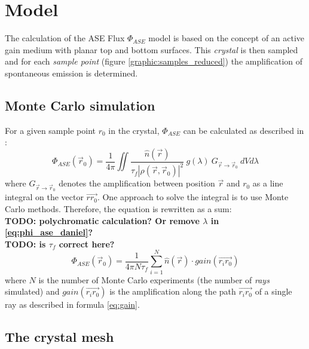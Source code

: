 \section{Model}

The calculation of the ASE Flux $\Phi_{ASE}$ model is based on the concept of an
active gain medium with planar top and bottom surfaces. This \emph{crystal} is
then sampled and for each \emph{sample point} (figure
\ref{graphic:samples_reduced}) the amplification of spontaneous emission is
determined. 



\subsection{Monte Carlo simulation}
\label{subsec:monteCarlo}

For a given sample point $r_0$ in the crystal, $\Phi_{ASE}$ can
be calculated as described in \cite{ASE2010}:
\begin{equation}
  \label{eq:phi_ase_daniel} 
  \Phi_{ASE}(\vec{r}_0)=\frac{1}{4\pi}\iint
  \frac
    {\hat{n}(\vec{r})}
    {\tau_{f}|\rho(\vec{r},\vec{r}_0)|^2}
  ~g(\lambda)
  ~G_{\vec{r}\rightarrow\vec{r}_0}
  ~dV d\lambda
\end{equation}
where $G_{\vec{r}\rightarrow\vec{r}_0}$ denotes the amplification between
position $\vec{r}$ and $r_0$ as a line integral on the vector
$\overrightarrow{rr_0}$.  One approach to solve the integral is to use Monte
Carlo methods. Therefore, the equation is rewritten as a sum:
\textbf{\\TODO: polychromatic calculation? Or remove $\lambda$ in
\eqref{eq:phi_ase_daniel}?\\}
\textbf{TODO: is $\tau_f$ correct here?} 
\begin{equation}
  \label{eq:monte_carlo_ase}
  \Phi_{ASE}(\vec{r}_0) = 
  \frac{1}{4\pi N\tau_f}
  \sum^{N}_{i=1} \hat{n}(\vec{r}) \cdot gain(\overrightarrow{r_ir_0})
\end{equation}
where $N$ is the number of Monte Carlo experiments (the number of \emph{rays}
simulated) and $gain(\overrightarrow{r_ir_0})$ is the amplification along the
path $\overrightarrow{r_ir_0}$ of a single ray as described in formula
\eqref{eq:gain}.




\subsection{The crystal mesh} \label{subsec:meshSampling}

